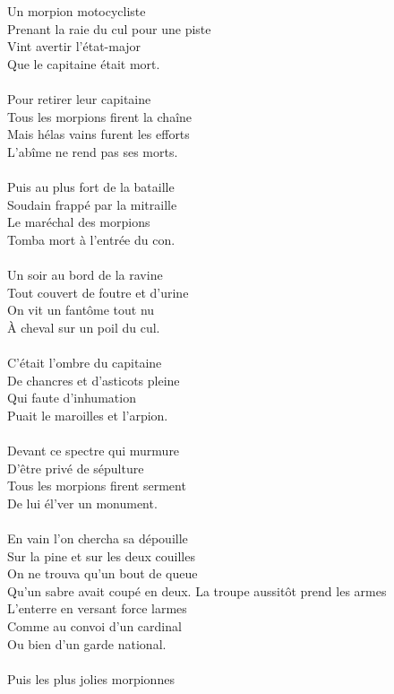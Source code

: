 \\\\Un morpion motocycliste
\\Prenant la raie du cul pour une piste
\\Vint avertir l'état-major
\\Que le capitaine était mort.
\\\\Pour retirer leur capitaine
\\Tous les morpions firent la chaîne
\\Mais hélas vains furent les efforts
\\L'abîme ne rend pas ses morts.
\\\\Puis au plus fort de la bataille
\\Soudain frappé par la mitraille
\\Le maréchal des morpions
\\Tomba mort à l'entrée du con.
\\\\Un soir au bord de la ravine
\\Tout couvert de foutre et d'urine
\\On vit un fantôme tout nu
\\À cheval sur un poil du cul.
\\\\C'était l'ombre du capitaine
\\De chancres et d'asticots pleine
\\Qui faute d'inhumation
\\Puait le maroilles et l'arpion.
\\\\Devant ce spectre qui murmure
\\D'être privé de sépulture
\\Tous les morpions firent serment
\\De lui él'ver un monument.
\\\\En vain l'on chercha sa dépouille
\\Sur la pine et sur les deux couilles
\\On ne trouva qu'un bout de queue
\\Qu'un sabre avait coupé en deux.
\breakpage
La troupe aussitôt prend les armes
\\L'enterre en versant force larmes
\\Comme au convoi d'un cardinal
\\Ou bien d'un garde national.
\\\\Puis les plus jolies morpionnes
